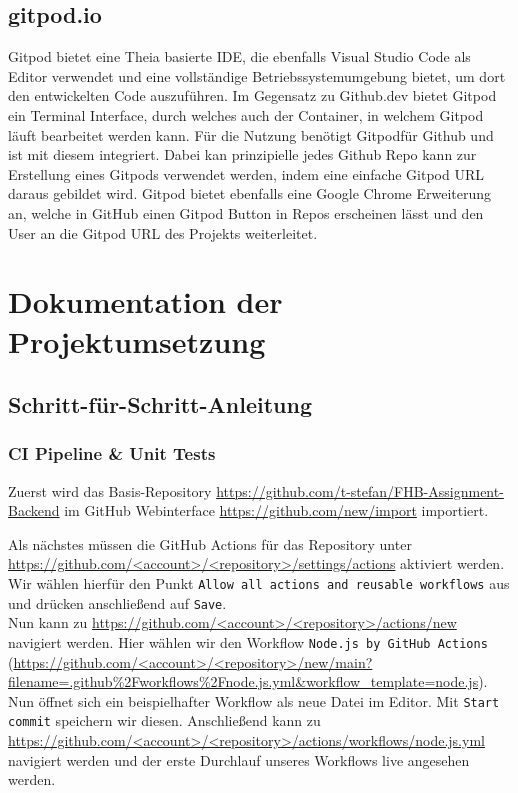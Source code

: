 \subsection{gitpod.io}
Gitpod bietet eine Theia basierte IDE, die ebenfalls Visual Studio Code als Editor verwendet und eine vollständige Betriebssystemumgebung bietet, um dort den entwickelten Code auszuführen. Im Gegensatz zu Github.dev bietet Gitpod ein Terminal Interface, durch welches auch der Container, in welchem Gitpod läuft bearbeitet werden kann.
Für die Nutzung benötigt Gitpodfür Github und ist mit diesem integriert. Dabei kan prinzipielle jedes Github Repo kann zur Erstellung eines Gitpods verwendet werden, indem eine einfache Gitpod URL daraus gebildet wird. Gitpod bietet ebenfalls eine Google Chrome Erweiterung an, welche in GitHub einen Gitpod Button in Repos erscheinen lässt und den User an die Gitpod URL des Projekts weiterleitet.

\clearpage
\section{Dokumentation der Projektumsetzung}

\subsection{Schritt-für-Schritt-Anleitung}

\subsubsection{CI Pipeline \& Unit Tests}
Zuerst wird das Basis-Repository 
\url{https://github.com/t-stefan/FHB-Assignment-Backend}
im GitHub Webinterface
\url{https://github.com/new/import} 
importiert.

\noindent
Als nächstes müssen die GitHub Actions für das Repository unter
\url{https://github.com/<account>/<repository>/settings/actions}
aktiviert werden.
Wir wählen hierfür den Punkt \verb|Allow all actions and reusable workflows| aus
und drücken anschließend auf \verb|Save|. \\

\noindent
Nun kann zu \url{https://github.com/<account>/<repository>/actions/new}
navigiert werden.
Hier wählen wir den Workflow \verb|Node.js by GitHub Actions| 
(\url{https://github.com/<account>/<repository>/new/main?filename=.github%2Fworkflows%2Fnode.js.yml&workflow_template=node.js}).
Nun öffnet sich ein beispielhafter Workflow als neue Datei im Editor.
Mit \verb|Start commit| speichern wir diesen.
Anschließend kann zu \url{https://github.com/<account>/<repository>/actions/workflows/node.js.yml}
navigiert werden und der erste Durchlauf unseres Workflows live angesehen werden. \\

